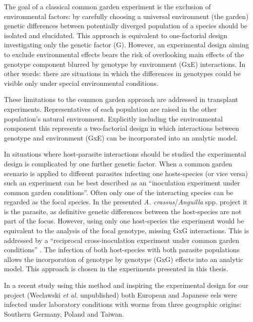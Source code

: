 The goal of a classical common garden experiment is the exclusion of
environmental factors: by carefully choosing a universal environment
(the garden) genetic differences between potentially diverged
population of a species should be isolated and elucidated. This
approach is equivalent to one-factorial design investigating only the
genetic factor (G). However, an experimental design aiming to exclude
environmental effects bears the risk of overlooking main effects of
the genotype component blurred by genotype by environment (GxE)
interactions. In other words: there are situations in which the
differences in genotypes could be visible only under special
environmental conditions.

These limitations to the common garden approach are addressed in
transplant experiments. Representatives of each population are raised
in the other population's natural environment. Explicitly including
the environmental component this represents a two-factorial design in
which interactions between genotype and environment (GxE) can be
incorporated into an analytic model.

In situations where host-parasite interactions should be studied the
experimental design is complicated by one further genetic factor.
When a common garden scenario is applied to different parasites
infecting one hosts-species (or vice versa) such an experiment can be
best described as an ``inoculation experiment under common garden
conditions''. Often only one of the interacting species can be
regarded as the focal species. In the presented
\textit{A. crassus}/\textit{Anguilla} spp. project it is the parasite,
as definitive genetic differences between the host-species are not
part of the focus. However, using only one host-species the experiment
would be equivalent to the analysis of the focal genotype, missing GxG
interactions. This is addressed by a ``reciprocal cross-inoculation
experiment under common garden conditions'' \cite{kaltz_shykoff_rev}.
The infection of both host-species with both parasite populations
allows the incorporation of genotype by genotype (GxG) effects into an
analytic model. This approach is chosen in the experiments presented
in this thesis.

In a recent study using this method and inspiring the experimental
design for our project (Weclawski \textit{et al.} unpublished) both
European and Japanese eels were infected under laboratory conditions
with worms from three geographic origins: Southern Germany, Poland and
Taiwan.


